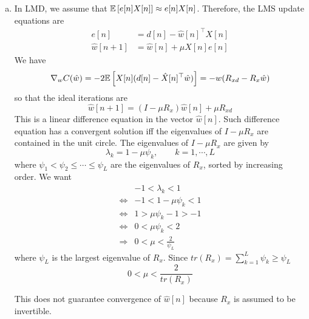 \begin{enumerate}[(a)]
\item In LMD, we assume that $\mathbb{E} \left[ e[n]X[n] \right] \approx e[n]X[n]$. Therefore, the LMS update equations are
\begin{align*}
	e[n] &= d[n] - \hat{w}[n]^\top X[n] \\
	\hat{w}[n+1] &= \hat{w}[n] + \mu X[n] e[n]
\end{align*}
We have
\[\nabla_w C(\hat{w}) = -2 \mathbb{E} \left[ X[n](d[n]-\hat{X}[n]^\top\hat{w}) \right] = -w(R_{xd} - R_x\hat{w})\]
so that the ideal iterations are
\[\hat{w}[n+1] = (I - \mu R_x) \hat{w}[n] + \mu R_{xd}\]
This is a linear difference equation in the vector $\hat{w}[n]$. Such difference equation has a convergent solution iff the eigenvalues of $I - \mu R_x$ are contained in the unit circle. The eigenvalues of $I - \mu R_x$ are given by
\[\lambda_k = 1 - \mu \psi_k, \qquad k = 1, \cdots, L\]
where $\psi_1 < \psi_2 \leq \cdots \leq \psi_L$ are the eigenvalues of $R_x$, sorted by increasing order. We want 
\begin{align*}
	& -1 < \lambda_k < 1\\
	\Leftrightarrow& -1 < 1 - \mu \psi_k < 1 \\
	\Leftrightarrow& 1 > \mu \psi_k -1 > -1 \\
	\Leftrightarrow& 0 < \mu \psi_k <2 \\
	\Rightarrow& 0 < \mu < \frac{2}{\psi_L}
\end{align*}
where $\psi_L$ is the largest eigenvalue of $R_x$. Since $tr(R_x) = \sum_{k=1}^{L}\psi_k \geq \psi_L$
\[0 < \mu < \frac{2}{tr(R_x)}\]

This does not guarantee convergence of $\hat{w}[n]$ because $R_x$ is assumed to be invertible.
\end{enumerate}